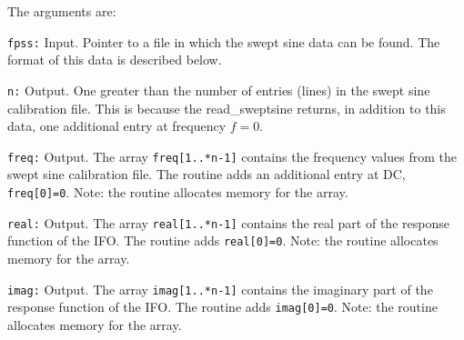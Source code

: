 The arguments are:
\begin{description}
\item{\tt fpss:} Input.  Pointer to a file in which the swept sine data can be
  found.  The format of this data is described below.
\item{\tt n:} Output.  One greater than the number of entries (lines) in the swept sine calibration file.
This is because the {read\_sweptsine} returns, in addition to this data, one additional entry at
frequency $f=0$.
\item{\tt freq:} Output.  The array {\tt *freq[1..*n-1]} contains the frequency values from the
 swept sine calibration file.  The routine adds an additional entry at DC, {\tt *freq[0]=0}.
 Note: the routine allocates memory for the array.
\item{\tt real:} Output.  The array {\tt *real[1..*n-1]} contains the real part of the response function of the
IFO.  The routine adds {\tt *real[0]=0}.  Note: the routine allocates memory for the array.
\item{\tt imag:} Output.  The array {\tt *imag[1..*n-1]} contains the imaginary part of the response function of the
IFO.  The routine adds {\tt *imag[0]=0}.  Note: the routine allocates memory for the array.
\end{description}

